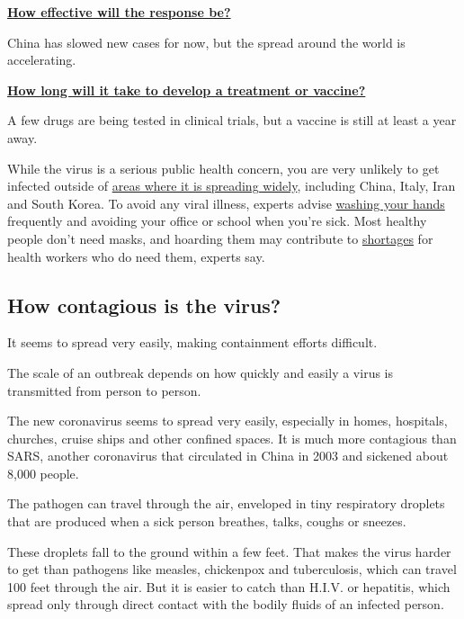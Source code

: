 \protect\hyperlink{response}{\textbf{How effective will the response
be?}}

China has slowed new cases for now, but the spread around the world is
accelerating.

\protect\hyperlink{vaccine}{\textbf{How long will it take to develop a
treatment or vaccine?}}

A few drugs are being tested in clinical trials, but a vaccine is still
at least a year away.

While the virus is a serious public health concern, you are very
unlikely to get infected outside of
\href{https://www.nytimes3xbfgragh.onion/interactive/2020/world/coronavirus-maps.html}{areas
where it is spreading widely}, including China, Italy, Iran and South
Korea. To avoid any viral illness, experts advise
\href{https://www.nytimes3xbfgragh.onion/2020/01/28/opinion/coronavirus-prevention-tips.html}{washing
your hands} frequently and avoiding your office or school when you're
sick. Most healthy people don't need masks, and hoarding them may
contribute to
\href{https://www.nytimes3xbfgragh.onion/2020/01/29/health/coronavirus-masks-hoarding.html}{shortages}
for health workers who do need them, experts say.

\hypertarget{how-contagious-is-the-virus}{%
\subsection{How contagious is the
virus?}\label{how-contagious-is-the-virus}}

It seems to spread very easily, making containment efforts difficult.

The scale of an outbreak depends on how quickly and easily a virus is
transmitted from person to person.

The new coronavirus seems to spread very easily, especially in homes,
hospitals, churches, cruise ships and other confined spaces. It is much
more contagious than SARS, another coronavirus that circulated in China
in 2003 and sickened about 8,000 people.

The pathogen can travel through the air, enveloped in tiny respiratory
droplets that are produced when a sick person breathes, talks, coughs or
sneezes.

These droplets fall to the ground within a few feet. That makes the
virus harder to get than pathogens like measles, chickenpox and
tuberculosis, which can travel 100 feet through the air. But it is
easier to catch than H.I.V. or hepatitis, which spread only through
direct contact with the bodily fluids of an infected person.

